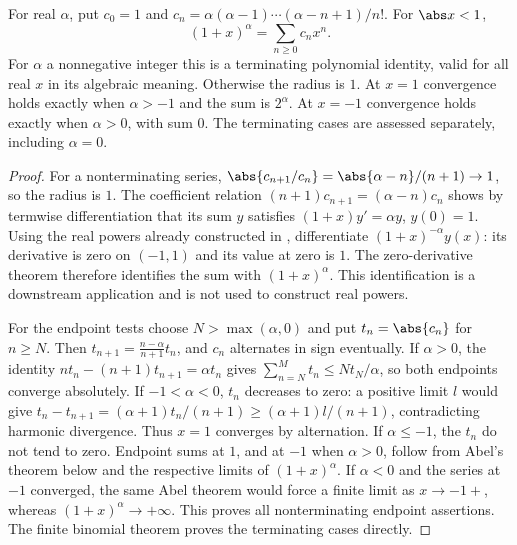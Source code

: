 \begin{theorem}
For real $\alpha$, put $c_0=1$ and $c_n=\alpha(\alpha-1)\cdots(\alpha-n+1)/n!$. For $\abs x<1$,
\[(1+x)^\alpha=\sum_{n\geq0}c_nx^n.\]
For $\alpha$ a nonnegative integer this is a terminating polynomial identity, valid for all real $x$ in its algebraic meaning. Otherwise the radius is $1$. At $x=1$ convergence holds exactly when $\alpha>-1$ and the sum is $2^\alpha$. At $x=-1$ convergence holds exactly when $\alpha>0$, with sum $0$. The terminating cases are assessed separately, including $\alpha=0$.
\end{theorem}
\begin{proof}
For a nonterminating series, $\abs{c_{n+1}/c_n}=\abs{\alpha-n}/(n+1)\to1$, so the radius is $1$. The coefficient relation $(n+1)c_{n+1}=(\alpha-n)c_n$ shows by termwise differentiation that its sum $y$ satisfies $(1+x)y'=\alpha y$, $y(0)=1$. Using the real powers already constructed in , differentiate $(1+x)^{-\alpha}y(x)$: its derivative is zero on $(-1,1)$ and its value at zero is $1$. The zero-derivative theorem therefore identifies the sum with $(1+x)^\alpha$. This identification is a downstream application and is not used to construct real powers.

For the endpoint tests choose $N>\max(\alpha,0)$ and put $t_n=\abs{c_n}$ for $n\geq N$. Then $t_{n+1}=\frac{n-\alpha}{n+1}t_n$, and $c_n$ alternates in sign eventually. If $\alpha>0$, the identity $nt_n-(n+1)t_{n+1}=\alpha t_n$ gives $\sum_{n=N}^Mt_n\leq Nt_N/\alpha$, so both endpoints converge absolutely. If $-1<\alpha<0$, $t_n$ decreases to zero: a positive limit $l$ would give $t_n-t_{n+1}=(\alpha+1)t_n/(n+1)\geq(\alpha+1)l/(n+1)$, contradicting harmonic divergence. Thus $x=1$ converges by alternation. If $\alpha\leq-1$, the $t_n$ do not tend to zero. Endpoint sums at $1$, and at $-1$ when $\alpha>0$, follow from Abel's theorem below and the respective limits of $(1+x)^\alpha$. If $\alpha<0$ and the series at $-1$ converged, the same Abel theorem would force a finite limit as $x\to-1+$, whereas $(1+x)^\alpha\to+\infty$. This proves all nonterminating endpoint assertions. The finite binomial theorem proves the terminating cases directly.
\end{proof}

